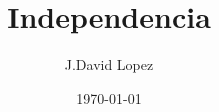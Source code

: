 \title{Independencia}
\author{J.David Lopez}
\date{\today}

\makeatletter
\newcommand\mymaketitle{%
  \begin{titlepage}
    \null\vfil\vskip 40\p@
    \begin{center}
      {\LARGE \@title \par}
      \vskip 2.5em
      {\large \lineskip .75em \@author \par}
      \vskip 1.5em
      {\large \@date \par}
      \vskip 2.5em
        \graphicspath{  }               %
            \texttt{[image: figures/complutense.png]}
    \end{center}\par
    \@thanks
    \vfil\null
  \end{titlepage}
}
\makeatother
